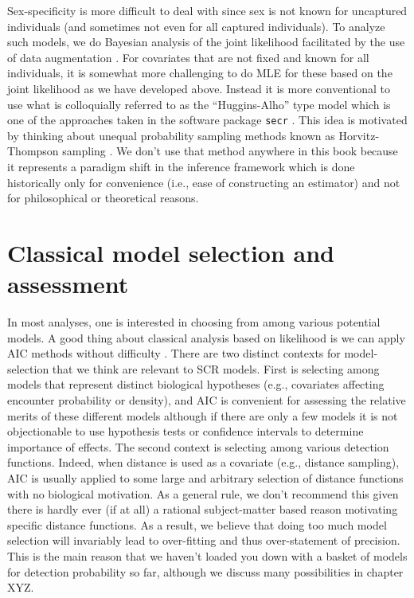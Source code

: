 Sex-specificity is more difficult to deal with since sex is not known
for uncaptured individuals (and sometimes not even for all captured
individuals).  To analyze such models, we do Bayesian analysis of the
joint likelihood facilitated by the use of data augmentation
\citep{gardner_etal:2010jwm,russell_etal:2012}. For covariates that are
not fixed and known for all individuals, it is somewhat more
challenging to do MLE for these based on the joint likelihood as we
have developed above. Instead it is more conventional to use what is
colloquially referred to as the ``Huggins-Alho'' type model which is
one of the approaches taken in the software package \mbox{\tt secr}
\citep[][see Sec. \ref{mle.sec.secr}]{efford:2011}. This idea is
motivated by thinking about unequal probability sampling methods known
as Horvitz-Thompson sampling \citep[e.g.,
see][]{overton_stehman:1995}.  We don't use that method anywhere in
this book because it represents a paradigm shift in the inference
framework which is done historically only for convenience (i.e., ease
of constructing an estimator) and not for philosophical or theoretical
reasons.






\section{Classical model selection and assessment}

In most analyses, one is interested in choosing from among various
potential models. A good thing about classical analysis based on
likelihood is we can apply AIC methods without difficulty
\citep{burnham_anderson:2002}. There are two distinct contexts for
model-selection that we think are relevant to SCR models. First is
selecting among models that represent distinct biological hypotheses
(e.g., covariates affecting encounter probability or density), and AIC
is convenient for assessing the relative merits of these different
models although if there are only a few models it is not objectionable
to use hypothesis tests or confidence intervals to determine
importance of effects. The second context is selecting among various
detection functions. 
Indeed, when distance is used as a covariate (e.g., distance
sampling), AIC is usually
applied to some large and arbitrary selection of distance
functions with no biological motivation.
As a general rule, we don’t recommend this given there is hardly ever (if at
all) a rational subject-matter based reason motivating specific 
distance functions. As a result, we believe that doing too much model
selection will
invariably lead to over-fitting and thus over-statement of
precision. This is the main reason that we haven't loaded you down
with a basket of models for detection probability so far, although we
discuss many possibilities in chapter XYZ. 


